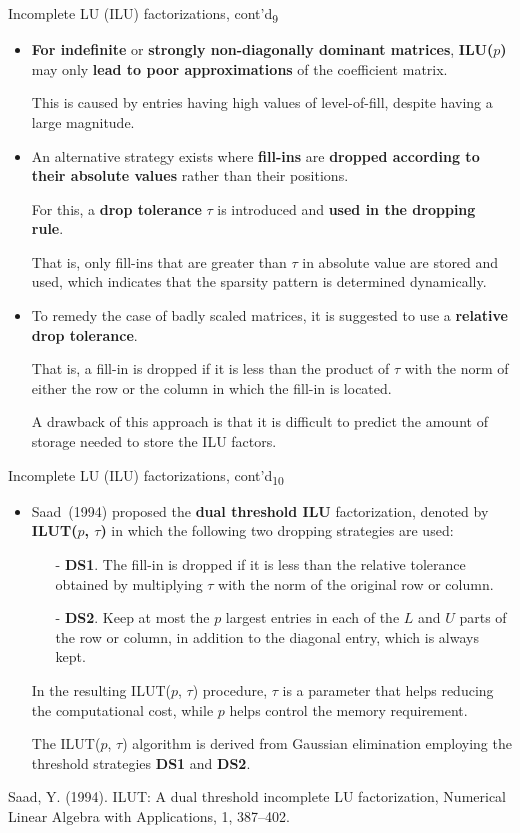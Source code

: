 \documentclass[t,usepdftitle=false]{beamer}
\begin{document}
\begin{frame}{Incomplete LU (ILU) factorizations, cont'd\textsubscript{9}}
\begin{itemize}
\item \textbf{For indefinite} or \textbf{strongly non-diagonally dominant matrices}, \textbf{ILU($p$)} may only \textbf{lead to poor approximations} of the coefficient matrix.
\item[] This is caused by entries having high values of level-of-fill, despite having a large magnitude.
\item An alternative strategy exists where \textbf{fill-ins} are \textbf{dropped according to their absolute values} rather than their positions.
\item[] For this, a \textbf{drop tolerance} $\tau$ is introduced and \textbf{used in the dropping rule}.
\item[] That is, only fill-ins that are greater than $\tau$ in absolute value are stored and used, which indicates that the sparsity pattern is determined dynamically.
\item To remedy the case of badly scaled matrices, it is suggested to use a \textbf{relative drop tolerance}.
\item[] That is, a fill-in is dropped if it is less than the product of $\tau$ with the norm of either the row or the column in which the fill-in is located.
\item[] A drawback of this approach is that it is difficult to predict the amount of storage needed to store the ILU factors.
\end{itemize}
\end{frame}

\begin{frame}{Incomplete LU (ILU) factorizations, cont'd\textsubscript{10}}
\begin{itemize}
\item Saad~(1994) proposed the \textbf{dual threshold ILU} factorization, denoted by \textbf{ILUT($p$, $\tau$)} in which the following two dropping strategies are used:
\begin{itemize}\normalsize
\item[-] \textbf{DS1}. The fill-in is dropped if it is less than the relative tolerance obtained by multiplying $\tau$ with the norm of the original row or column.
\item[-] \textbf{DS2}. Keep at most the $p$ largest entries in each of the $L$ and $U$ parts of the row or column, in addition to the diagonal entry, which is always kept.
\end{itemize}
In the resulting ILUT($p$, $\tau$) procedure, $\tau$ is a parameter that helps reducing the computational cost, while $p$ helps control the memory requirement.
\item[] The ILUT($p$, $\tau$) algorithm is derived from Gaussian elimination employing the threshold strategies \textbf{DS1} and \textbf{DS2}.
\end{itemize}\smallskip
\tiny{Saad, Y. (1994). ILUT: A dual threshold incomplete LU factorization, Numerical Linear Algebra with Applications, 1, 387–402.}
\end{frame}
\end{document}
